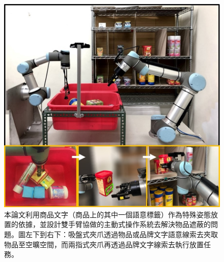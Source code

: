 \begin{figure}[H]
	\centering
	\includegraphics[height=!, width=1.0\linewidth, keepaspectratio=true]
	{./figures/pose-aware-placing-teaser-v3.jpg}
  \caption{本論文利用商品文字（商品上的其中一個語意標籤）作為特殊姿態放置的依據，並設計雙手臂協做的主動式操作系統去解決物品遮蔽的問題。圖左下到右下：吸盤式夾爪透過物品或品牌文字語意線索去夾取物品至空曠空間，而兩指式夾爪再透過品牌文字線索去執行放置任務。}
  \label{figure:teaser}
\end{figure}
